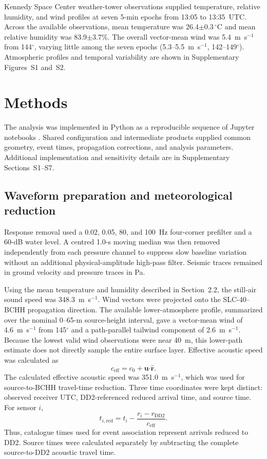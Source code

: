 \documentclass[]{seismica}
\begin{document}
Kennedy Space Center weather-tower observations supplied temperature,
relative humidity, and wind profiles at seven 5-min epochs from 13:05 to
13:35~UTC. Across the available observations, mean temperature was
26.4$\pm0.3\,^{\circ}$C and mean relative humidity was
83.9$\pm3.7\%$. The overall vector-mean wind was 5.4~m~s$^{-1}$ from
144$^\circ$, varying little among the seven epochs (5.3--5.5~m~s$^{-1}$,
142--149$^\circ$).
Atmospheric profiles and temporal variability are shown in Supplementary
Figures~S1 and~S2.

\FloatBarrier

\section{Methods}
\label{sec:methods}

The analysis was implemented in Python as a reproducible sequence of Jupyter
notebooks \citep{kluyver2016jupyter}. Shared configuration and intermediate
products supplied common geometry, event times, propagation corrections, and
analysis parameters. Additional implementation and sensitivity details are in
Supplementary Sections~S1--S7.

\subsection{Waveform preparation and meteorological reduction}

Response removal used a 0.02, 0.05, 80, and 100~Hz four-corner prefilter and a
60-dB water level. A centred 1.0-s moving median was then removed independently
from each pressure channel to suppress slow baseline variation without an
additional physical-amplitude high-pass filter. Seismic traces remained in
ground velocity and pressure traces in Pa.

Using the mean temperature and humidity described in Section~2.2, the
still-air sound speed was 348.3~m~s$^{-1}$. Wind vectors were projected onto
the SLC-40--BCHH propagation direction. The available lower-atmosphere profile,
summarized over the nominal 0--65-m source-height interval, gave a vector-mean
wind of 4.6~m~s$^{-1}$ from 145$^\circ$ and a path-parallel tailwind component
of 2.6~m~s$^{-1}$. Because the lowest valid wind observations were near 40~m,
this lower-path estimate does not directly sample the entire surface layer.
Effective acoustic speed was calculated as
\begin{equation}
 c_{\mathrm{eff}}=c_0+\mathbf{u}\boldsymbol{\cdot}\hat{\mathbf{r}}.
 \label{eq:effective_speed}
\end{equation}
The calculated effective acoustic speed was 351.0~m~s$^{-1}$, which was used
for source-to-BCHH travel-time reduction.
Three time coordinates were kept distinct: observed
receiver UTC, DD2-referenced reduced arrival time, and source time. For sensor
$i$,
\begin{equation}
 t_{i,\mathrm{red}}=t_i-\frac{r_i-r_{\mathrm{DD2}}}{c_{\mathrm{eff}}}.
 \label{eq:reduced_time}
\end{equation}
Thus, catalogue times used for event association represent arrivals reduced
to DD2. Source times were calculated separately by subtracting the complete
source-to-DD2 acoustic travel time.
\end{document}
